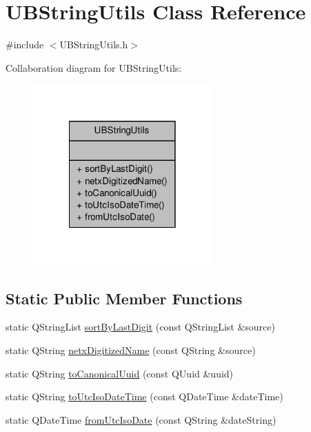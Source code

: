 \hypertarget{class_u_b_string_utils}{\section{U\-B\-String\-Utils Class Reference}
\label{dc/d4c/class_u_b_string_utils}
}


{\ttfamily \#include $<$U\-B\-String\-Utils.\-h$>$}



Collaboration diagram for U\-B\-String\-Utils\-:
\nopagebreak
\begin{figure}[H]
\begin{center}
\leavevmode
\includegraphics[width=194pt]{d7/d2a/class_u_b_string_utils__coll__graph}
\end{center}
\end{figure}
\subsection*{Static Public Member Functions}
\begin{DoxyCompactItemize}
\item 
static Q\-String\-List \hyperlink{class_u_b_string_utils_a1b2dcd75356d8d782392428b17bc8b5d}{sort\-By\-Last\-Digit} (const Q\-String\-List \&source)
\item 
static Q\-String \hyperlink{class_u_b_string_utils_ab462ec5a1ff0eb026ab25eb22d8730ad}{netx\-Digitized\-Name} (const Q\-String \&source)
\item 
static Q\-String \hyperlink{class_u_b_string_utils_af1f88e3aef7d3360b2302ebe2f6c9627}{to\-Canonical\-Uuid} (const Q\-Uuid \&uuid)
\item 
static Q\-String \hyperlink{class_u_b_string_utils_aca5c79d1ca00f4ecbf5e014b7d9810a6}{to\-Utc\-Iso\-Date\-Time} (const Q\-Date\-Time \&date\-Time)
\item 
static Q\-Date\-Time \hyperlink{class_u_b_string_utils_a0ae7f73763d7081967a14c4d093dda64}{from\-Utc\-Iso\-Date} (const Q\-String \&date\-String)
\end{DoxyCompactItemize}


